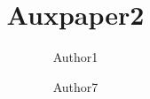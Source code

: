 \documentclass{standalone}
\begin{document}
\author{
  Author1
  \and
  Author7}
\title{Auxpaper2}
\maketitle

\label{pap:auxpaper2}
\begin{abstract}
  \lipsum[6-7]
\end{abstract}
\startcontents[chapters]
\lipsum[30-32]

\printbibliography[segment=\therefsegment,heading=subbibliography]
\stopcontents[chapters]
\end{document}
